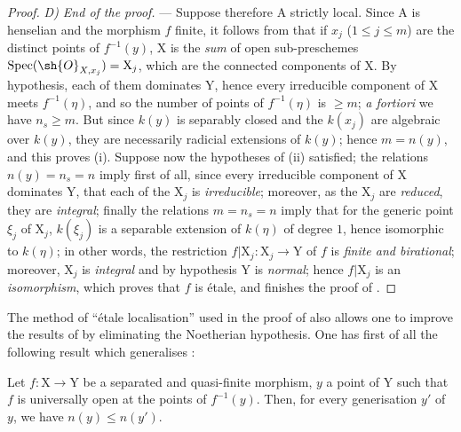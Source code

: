 \begin{proof}
\emph{D) End of the proof.} ---
Suppose therefore $\mathrm{A}$ strictly local.
Since $\mathrm{A}$ is henselian and the morphism $f$ finite, it follows from  that if $x_j$ ($1\leq j\leq m$) are the distinct points of $f^{-1}(y)$, $\mathrm{X}$ is the \emph{sum} of open sub-preschemes $\operatorname{Spec}(\sh{O}_{X,x_j})=\mathrm{X}_j$, which are the connected components of $\mathrm{X}$.
By hypothesis, each of them dominates $\mathrm{Y}$, hence every irreducible component of $\mathrm{X}$ meets $f^{-1}(\eta)$, and so the number of points of $f^{-1}(\eta)$ is $\geq m$; \emph{a fortiori} we have $n_s\geq m$.
But since $k(y)$ is separably closed and the $k(x_j)$ are algebraic over $k(y)$, they are necessarily radicial extensions of $k(y)$; hence $m=n(y)$, and this proves (i).
Suppose now the hypotheses of (ii) satisfied; the relations $n(y)=n_s=n$ imply first of all, since every irreducible component of $\mathrm{X}$ dominates $\mathrm{Y}$, that each of the $\mathrm{X}_j$ is \emph{irreducible}; moreover, as the $\mathrm{X}_j$ are \emph{reduced}, they are \emph{integral}; finally the relations $m=n_s=n$ imply that for the generic point $\xi_j$ of $\mathrm{X}_j$, $k(\xi_j)$ is a separable extension of $k(\eta)$ of degree $1$, hence isomorphic to $k(\eta)$; in other words, the restriction $f|\mathrm{X}_j:\mathrm{X}_j\to\mathrm{Y}$ of $f$ is \emph{finite and birational}; moreover, $\mathrm{X}_j$ is \emph{integral} and by hypothesis $\mathrm{Y}$ is \emph{normal}; hence  $f|\mathrm{X}_j$ is an \emph{isomorphism}, which proves that $f$ is \'etale, and finishes the proof of .
\end{proof}

\begin{remark}[18.10.17]
\label{IV.18.10.17}
The method of ``\'etale localisation'' used in the proof of  also allows one to improve the results of  by eliminating the Noetherian hypothesis.
One has first of all the following result which generalises :
\end{remark}

\begin{env}[18.10.17.1]
\label{IV.18.10.17.1}
Let $f:\mathrm{X}\to\mathrm{Y}$ be a separated and quasi-finite morphism, $y$ a point of $\mathrm{Y}$ such that $f$ is universally open at the points of $f^{-1}(y)$.
Then, for every generisation $y'$ of $y$, we have $n(y)\leq n(y')$.
\end{env}

